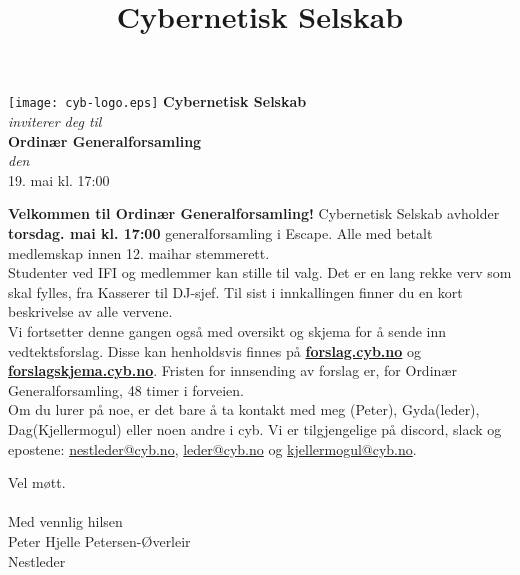 \documentclass[12pt, norsk, a4paper]{proc}
\title{Cybernetisk Selskab}
\newcommand{\genforsDato}{19. mai  kl. 17:00} %
\newcommand{\genforsDag}{torsdag} %
\newcommand{\genforsDatoUkeFoer}{12. mai} %
\newcommand{\generalforsamling}{Ordinær Generalforsamling} %
\newcommand{\leder}{Gyda} %
\newcommand{\nestlederFornavn}{Peter} %
\newcommand{\nestlederFulltNavn}{Peter Hjelle Petersen-Øverleir} %
\newcommand{\mogul}{Dag} %
\begin{document}
   \begin{strip}
       \begin{center}
           \texttt{[image: cyb-logo.eps]} 
            \Large\textbf{Cybernetisk Selskab}\\
            \textit{inviterer deg til}\\
            \large\textbf{\generalforsamling} \\
            \emph{den} \\
            \large \genforsDato \\
       \end{center}
   \end{strip}

\textbf{Velkommen til \generalforsamling!}
Cybernetisk Selskab avholder \textbf{\genforsDag \space \genforsDato} generalforsamling i Escape. Alle med betalt medlemskap innen \genforsDatoUkeFoer \space har stemmerett.\\

Studenter ved IFI og medlemmer kan stille til valg. Det er en lang rekke verv
som skal fylles, fra 
Kasserer 
til 
DJ-sjef.
Til
sist i innkallingen finner du en kort beskrivelse av alle vervene.\\

Vi fortsetter denne gangen også med oversikt og skjema for å sende inn vedtektsforslag. Disse kan henholdsvis finnes på \textbf{\href{http://forslag.cyb.no/}{forslag.cyb.no}} og \textbf{\href{http://forslagskjema.cyb.no/}{forslagskjema.cyb.no}}. Fristen for innsending av forslag er,  for \generalforsamling, 48 timer i forveien. \\

Om du lurer på noe, er det bare å ta kontakt med 
meg (\nestlederFornavn), \leder \space (leder), \mogul \space (Kjellermogul) eller noen andre i cyb. Vi er tilgjengelige på
discord, slack og epostene: \href{mailto:nestleder@cyb.no}{nestleder@cyb.no}, \href{mailto:leder@cyb.no}{leder@cyb.no} og
\href{mailto:kjellermogul@cyb.no}{kjellermogul@cyb.no}.

Vel møtt.\\\\
Med vennlig hilsen\\
\nestlederFulltNavn\\
Nestleder
\end{document}
